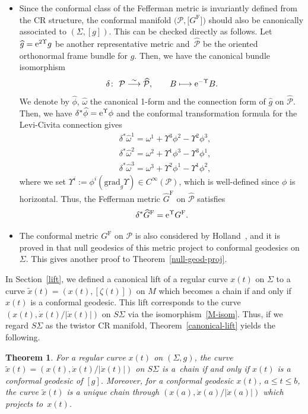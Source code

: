 \documentclass[pdftex]{sigma}
\renewcommand\d{\delta}
\newcommand{\wh}{\widehat}
\numberwithin{equation}{section}
\newtheorem{Theorem}{Theorem}[section]
\begin{document}
\begin{Remark}
\begin{itemize}
\item[(ii)] Since the conformal class of the Fefferman metric is invariantly defined from the CR structure, the conformal manifold $\bigl(\mathcal{P}, \bigl[G^{\mathrm{F}}\bigr]\bigr)$ should also be canonically associated to $(\Sigma, [g])$. This can be checked directly as follows.
Let $\wh g={\rm e}^{2\Upsilon}g$ be another representative metric and~$\wh{\mathcal{P}}$ be the oriented orthonormal frame bundle for $\wh g$.
Then, we have the canonical bundle isomorphism
\[
\d\colon\ \mathcal{P}\overset{\sim}{\longrightarrow}
\wh{\mathcal{P}}, \qquad B\longmapsto {\rm e}^{-\Upsilon}B.
\]
We denote by
$\wh\phi$, $\wh\omega$ the canonical 1-form and the connection form of $\wh g$ on $\wh{\mathcal{P}}$. Then, we have $\d^*\wh\phi={\rm e}^{\Upsilon}\phi$ and
the conformal transformation formula for the Levi-Civita connection gives
\begin{align*}
&\d^*\wh\omega^1=\omega^1+\Upsilon^3\phi^2-\Upsilon^2\phi^3, \\
&\d^*\wh\omega^2=\omega^2+\Upsilon^1\phi^3-\Upsilon^3\phi^1, \\
&\d^*\wh\omega^3=\omega^3+\Upsilon^2\phi^1-\Upsilon^1\phi^2,
\end{align*}
where we set $\Upsilon^i:=\phi^i(\mathrm{grad}_g \Upsilon)\in C^\infty(\mathcal{P})$, which is well-defined since $\phi$ is horizontal.
Thus, the Fefferman metric $\wh{G}^{\mathrm{F}}$ on $\wh{\mathcal{P}}$ satisfies
\[
\d^* \wh{G}^{\mathrm{F}}={\rm e}^\Upsilon G^{\mathrm{F}}.
\]

\item[(iii)] The conformal metric $G^{\mathrm{F}}$ on $\mathcal{P}$ is also considered by Holland~\cite{H}, and it is proved in {\cite[Section~3.5.4]{H}} that null geodesics of this metric project to conformal geodesics on $\Sigma$. This gives another proof to Theorem~\ref{null-geod-proj}.
\end{itemize}
\end{Remark}

In Section~\ref{lift}, we defined a canonical lift of a regular curve $x(t)$ on $\Sigma$ to a curve $\tilde x(t)=(x(t), [\zeta(t)])$ on $M$ which becomes a chain if and only if $x(t)$ is a conformal geodesic. This lift corresponds to the curve $(x(t), \dot x(t)/|\dot x(t)|)$ on $S\Sigma$ via the isomorphism~\eqref{M-isom}. Thus, if we regard $S\Sigma$ as the twistor CR manifold,
Theorem~\ref{canonical-lift} yields the following.

\begin{Theorem}\label{chain-conf-geod2}
For a regular curve $x(t)$ on $(\Sigma, g)$, the curve $\tilde x(t)=(x(t), \dot x(t)/|\dot x(t)|)$ on $S\Sigma$ is a~chain if and only if $x(t)$ is a conformal geodesic of $[g]$. Moreover, for a conformal geodesic $x(t)$, $a\le t\le b$, the curve $\tilde x(t)$ is a unique chain through $(x(a), \dot x(a)/|\dot x(a)|)$ which projects to~$x(t)$.
\end{Theorem}
\end{document}
